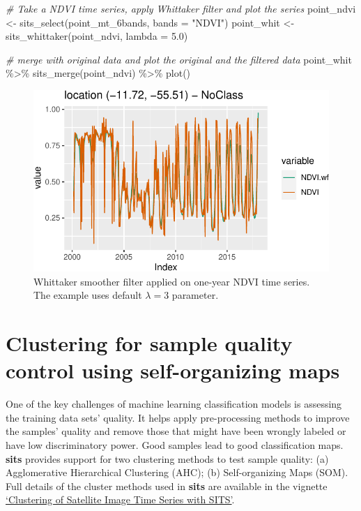 \documentclass[a4paper,]{tufte-book}
\newenvironment{Shaded}{}{}
\newcommand{\AttributeTok}[1]{\textcolor[rgb]{0.49,0.56,0.16}{#1}}
\newcommand{\CommentTok}[1]{\textcolor[rgb]{0.38,0.63,0.69}{\textit{#1}}}
\newcommand{\FloatTok}[1]{\textcolor[rgb]{0.25,0.63,0.44}{#1}}
\newcommand{\FunctionTok}[1]{\textcolor[rgb]{0.02,0.16,0.49}{#1}}
\newcommand{\NormalTok}[1]{#1}
\newcommand{\OtherTok}[1]{\textcolor[rgb]{0.00,0.44,0.13}{#1}}
\newcommand{\SpecialCharTok}[1]{\textcolor[rgb]{0.25,0.44,0.63}{#1}}
\newcommand{\StringTok}[1]{\textcolor[rgb]{0.25,0.44,0.63}{#1}}
\begin{document}
\begin{Shaded}
\begin{Highlighting}[]
\CommentTok{\# Take a NDVI time series, apply Whittaker filter and plot the series}
\NormalTok{point\_ndvi }\OtherTok{\textless{}{-}} \FunctionTok{sits\_select}\NormalTok{(point\_mt\_6bands, }\AttributeTok{bands =} \StringTok{"NDVI"}\NormalTok{)}
\NormalTok{point\_whit }\OtherTok{\textless{}{-}} \FunctionTok{sits\_whittaker}\NormalTok{(point\_ndvi, }\AttributeTok{lambda =} \FloatTok{5.0}\NormalTok{)}

\CommentTok{\# merge with original data and plot the original and the filtered data}
\NormalTok{point\_whit }\SpecialCharTok{\%\textgreater{}\%} 
  \FunctionTok{sits\_merge}\NormalTok{(point\_ndvi) }\SpecialCharTok{\%\textgreater{}\%} 
  \FunctionTok{plot}\NormalTok{()}
\end{Highlighting}
\end{Shaded}

\begin{figure}

{\centering \includegraphics[width=0.7\linewidth]{sitsbook_files/figure-latex/unnamed-chunk-11-1} 

}

\caption[Whittaker smoother filter applied on one-year NDVI time series]{Whittaker smoother filter applied on one-year NDVI time series. The example uses default $\lambda=3$ parameter.}\label{fig:unnamed-chunk-11}
\end{figure}

\hypertarget{clustering-for-sample-quality-control-using-self-organizing-maps}{%
\section{Clustering for sample quality control using self-organizing maps}\label{clustering-for-sample-quality-control-using-self-organizing-maps}}

One of the key challenges of machine learning classification models is assessing the training data sets' quality. It helps apply pre-processing methods to improve the samples' quality and remove those that might have been wrongly labeled or have low discriminatory power. Good samples lead to good classification maps. \textbf{sits} provides support for two clustering methods to test sample quality: (a) Agglomerative Hierarchical Clustering (AHC); (b) Self-organizing Maps (SOM). Full details of the cluster methods used in \textbf{sits} are available in the vignette \href{https://github.com/e-sensing/sits-docs/blob/master/doc/clustering.pdf}{`Clustering of Satellite Image Time Series with SITS'}.
\end{document}
